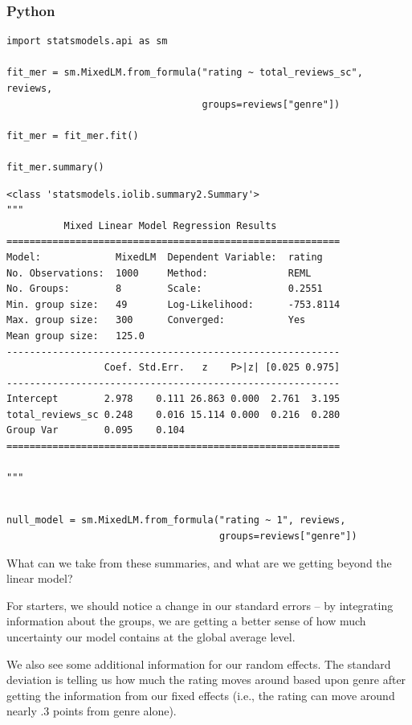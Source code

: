 \documentclass[
  letterpaper,
]{krantz}
\begin{document}
\subsubsection{Python}

\begin{verbatim}
import statsmodels.api as sm

fit_mer = sm.MixedLM.from_formula("rating ~ total_reviews_sc", reviews, 
                                  groups=reviews["genre"])

fit_mer = fit_mer.fit()

fit_mer.summary()
\end{verbatim}

\begin{verbatim}
<class 'statsmodels.iolib.summary2.Summary'>
"""
          Mixed Linear Model Regression Results
==========================================================
Model:             MixedLM  Dependent Variable:  rating   
No. Observations:  1000     Method:              REML     
No. Groups:        8        Scale:               0.2551   
Min. group size:   49       Log-Likelihood:      -753.8114
Max. group size:   300      Converged:           Yes      
Mean group size:   125.0                                  
----------------------------------------------------------
                 Coef. Std.Err.   z    P>|z| [0.025 0.975]
----------------------------------------------------------
Intercept        2.978    0.111 26.863 0.000  2.761  3.195
total_reviews_sc 0.248    0.016 15.114 0.000  0.216  0.280
Group Var        0.095    0.104                           
==========================================================

"""
\end{verbatim}

\begin{verbatim}

null_model = sm.MixedLM.from_formula("rating ~ 1", reviews, 
                                     groups=reviews["genre"])
\end{verbatim}

What can we take from these summaries, and what are we getting beyond
the linear model?

For starters, we should notice a change in our standard errors -- by
integrating information about the groups, we are getting a better sense
of how much uncertainty our model contains at the global average level.

We also see some additional information for our random effects. The
standard deviation is telling us how much the rating moves around based
upon genre after getting the information from our fixed effects (i.e.,
the rating can move around nearly .3 points from genre alone).
\end{document}
